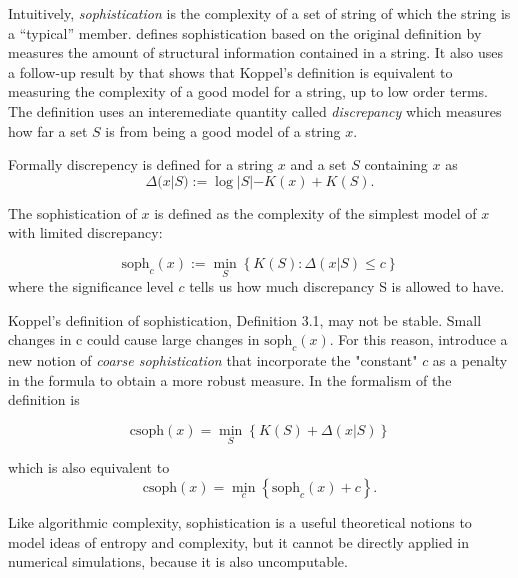 Intuitively, \emph{sophistication} is the complexity of a set of string of which
the string is a ``typical'' member.
\textcite{motaSophisticationRandomnessDeficiency2013} defines sophistication
based on the original definition by \textcite{koppelStructure1988,
  koppelAlmostMachineindependentTheory1991a} measures the amount of structural
information contained in a string. It also uses a follow-up result by
\parencite{vitanyiMeaningfulInformation2006} that shows that Koppel's definition
is equivalent to measuring the complexity of a good model for a string, up to
low order terms. The definition uses an interemediate quantity called
\emph{discrepancy} which measures how far a set $S$ is from being a good model
of a string $x$.

Formally discrepency is defined for a string $x$ and a set $S$ containing $x$ as
\begin{equation}
  \label{eq:6}
  \Delta(x|S) := \log |S| - K(x) + K(S).
\end{equation}

The sophistication of $x$ is defined as the complexity of the simplest model of
$x$ with limited discrepancy:

\begin{equation}
  \label{eq:7}
  \text{soph}_{c}(x) := \min_{S}\left\{ K(S): \Delta(x|S) \leq c \right\}
\end{equation}
where the significance level $c$ tells us how much discrepancy S is allowed to have.

Koppel’s definition of sophistication, Definition 3.1, may not be stable. Small
changes in c could cause large changes in $\text{soph}_{c}(x)$. For this reason,
\textcite{antunesSophisticationRevisited2009} introduce a new notion of \emph{coarse
sophistication} that incorporate the "constant" $c$ as a penalty in the formula
to obtain a more robust measure.
In the formalism of \textcite{motaSophisticationRandomnessDeficiency2013} the
definition is

\begin{equation}
  \label{eq:8}
  \text{csoph}(x) = \min_{S}\left\{ K(S) + \Delta(x|S) \right\}
\end{equation}

which is also equivalent to
\begin{equation}
  \label{eq:8}
  \text{csoph}(x) = \min_{c}\left\{ \text{soph}_{c}(x) + c \right\}.
\end{equation}

Like algorithmic complexity, sophistication is a useful theoretical notions to
model ideas of entropy and complexity, but it cannot be directly applied in
numerical simulations, because it is also uncomputable.

